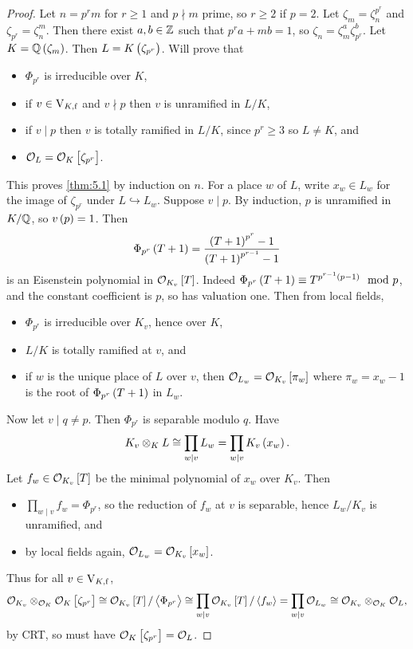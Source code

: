 \begin{proof}
Let $ n = p^rm $ for $ r \ge 1 $ and $ p \nmid m $ prime, so $ r \ge 2 $ if $ p = 2 $. Let $ \zeta_m = \zeta_n^{p^r} $ and $ \zeta_{p^r} = \zeta_n^m $. Then there exist $ a, b \in \mathbb{Z} $ such that $ p^ra + mb = 1 $, so $ \zeta_n = \zeta_m^a\zeta_{p^r}^b $. Let $ K = \QQ\br{\zeta_m} $. Then $ L = K\br{\zeta_{p^r}} $. Will prove that
\begin{itemize}
\item $ \Phi_{p^r} $ is irreducible over $ K $,
\item if $ v \in \mathrm{V}_{K, \mathrm{f}} $ and $ v \nmid p $ then $ v $ is unramified in $ L / K $,
\item if $ v \mid p $ then $ v $ is totally ramified in $ L / K $, since $ p^r \ge 3 $ so $ L \ne K $, and
\item $ \OOO_L = \OOO_K\sbr{\zeta_{p^r}} $.
\end{itemize}
This proves \ref{thm:5.1} by induction on $ n $. For a place $ w $ of $ L $, write $ x_w \in L_w $ for the image of $ \zeta_{p^r} $ under $ L \hookrightarrow L_w $. Suppose $ v \mid p $. By induction, $ p $ is unramified in $ K / \mathbb{Q} $, so $ v\br{p} = 1 $. Then
$$ \Phi_{p^r}\br{T + 1} = \dfrac{\br{T + 1}^{p^r} - 1}{\br{T + 1}^{p^{r - 1}} - 1} $$
is an Eisenstein polynomial in $ \OOO_{K_v}\sbr{T} $. Indeed $ \Phi_{p^r}\br{T + 1} \equiv T^{p^{r - 1}\br{p - 1}} \mod p $, and the constant coefficient is $ p $, so has valuation one. Then from local fields,
\begin{itemize}
\item $ \Phi_{p^r} $ is irreducible over $ K_v $, hence over $ K $,
\item $ L / K $ is totally ramified at $ v $, and
\item if $ w $ is the unique place of $ L $ over $ v $, then $ \OOO_{L_w} = \OOO_{K_v}\sbr{\pi_w} $ where $ \pi_w = x_w - 1 $ is the root of $ \Phi_{p^r}\br{T + 1} $ in $ L_w $.
\end{itemize}
Now let $ v \mid q \ne p $. Then $ \Phi_{p^r} $ is separable modulo $ q $. Have
$$ K_v \otimes_K L \cong \prod_{w \mid v} L_w = \prod_{w \mid v} K_v\br{x_w}. $$
Let $ f_w \in \OOO_{K_v}\sbr{T} $ be the minimal polynomial of $ x_w $ over $ K_v $. Then
\begin{itemize}
\item $ \prod_{w \mid v} f_w = \Phi_{p^r} $, so the reduction of $ f_w $ at $ v $ is separable, hence $ L_w / K_v $ is unramified, and
\item by local fields again, $ \OOO_{L_w} = \OOO_{K_v}\sbr{x_w} $.
\end{itemize}

\pagebreak

Thus for all $ v \in \mathrm{V}_{K, \mathrm{f}} $,
$$ \OOO_{K_v} \otimes_{\OOO_K} \OOO_K\sbr{\zeta_{p^r}} \cong \OOO_{K_v}\sbr{T} / \abr{\Phi_{p^r}} \cong \prod_{w \mid v} \OOO_{K_v}\sbr{T} / \abr{f_w} = \prod_{w \mid v} \OOO_{L_w} \cong \OOO_{K_v} \otimes_{\OOO_K} \OOO_L, $$
by CRT, so must have $ \OOO_K\sbr{\zeta_{p^r}} = \OOO_L $.
\end{proof}

